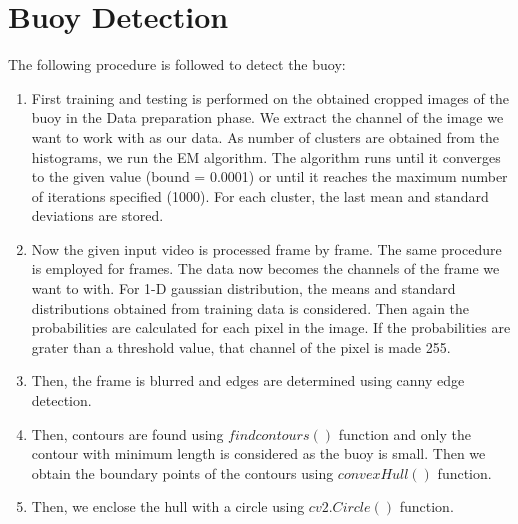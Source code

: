 \documentclass[12pt]{article}
\begin{document}
\section{Buoy Detection}
The following procedure is followed to detect the buoy:
\begin{enumerate}
\item First training and testing is performed on the obtained cropped images of the buoy in the Data preparation phase. We extract the channel of the image we want to work with as our data. As number of clusters are obtained from the histograms, we run the EM algorithm. The algorithm runs until it converges to the given value (bound = 0.0001) or until it reaches the maximum number of iterations specified (1000). For each cluster, the last mean and standard deviations are stored. 

\item Now the given input video is processed frame by frame. The same procedure is employed for frames. The data now becomes the channels of the frame we want to with. For 1-D gaussian distribution, the means and standard distributions obtained from training data is considered. Then again the probabilities are calculated for each pixel in the image. If the probabilities are grater than a threshold value, that channel of the pixel is made 255.

\item Then, the frame is blurred and edges are determined using canny edge detection.

\item Then, contours are found using $findcontours()$ function and only the contour with minimum length is considered as the buoy is small. Then we obtain the boundary points of the contours using $convexHull()$ function. 

\item Then, we enclose the hull with a circle using $cv2.Circle()$ function. 
\end{enumerate}
\newpage
\end{document}
